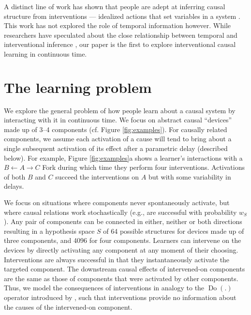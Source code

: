 \documentclass[10pt,letterpaper]{article}
\DeclareMathOperator*{\Do}{Do}
\newcommand{\ws}{w_S} %
\newcommand{\calm}{S} %
\begin{document}
A distinct line of work has shown that people are adept at inferring causal structure from interventions --- idealized actions that set variables in a system \citep[e.g.,][]{bramley2017neurath,coenen2015strategies}. This work has not explored the role of temporal information however. 
While researchers have speculated about the close relationship between temporal and interventional inference \citep[e.g.,][]{lagnado2004advantage}, our paper is the first to explore interventional causal learning in continuous time.

\section{The learning problem}

We explore the general problem of how people learn about a causal system by interacting with it in continuous time.
We focus on abstract causal ``devices'' made up of 3--4 components (cf. Figure \ref{fig:examples}).
For causally related components, we assume each activation of a cause will tend to bring about a single subsequent activation of its effect after a parametric delay (described below).  For example, Figure \ref{fig:examples}a shows a learner's interactions with a $B\leftarrow A \rightarrow C$ Fork during which time they perform four interventions.  Activations of both $B$ and $C$ succeed the interventions on $A$ but with some variability in delays.

We focus on situations where components never spontaneously activate, but where causal relations work stochastically (e.g., are successful with probability $\ws$). Any pair of components can be connected in either, neither or both directions resulting in a hypothesis space $\calm$ of 64 possible structures for devices made up of three components, and 4096 for four components.  Learners can intervene on the devices by directly activating any component at any moment of their choosing. Interventions are always successful in that they instantaneously activate the targeted component. The downstream causal effects of intervened-on components are the same as those of components that were activated by other components. Thus, we model the consequences of interventions in analogy to the $\Do(.)$ operator introduced by \cite{pearl2000causality}, such that interventions provide no information about the causes of the intervened-on component.
\end{document}
